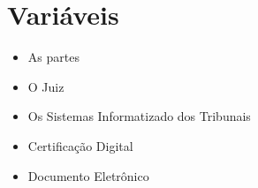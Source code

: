 \chapter{Variáveis}
\begin{itemize}
    \item As partes
    \item O Juiz
    \item Os Sistemas Informatizado dos Tribunais
    \item Certificação Digital
    \item Documento Eletrônico
\end{itemize}
